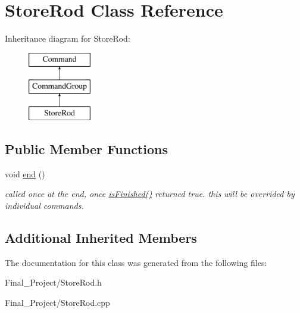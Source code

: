 \hypertarget{classStoreRod}{\section{Store\-Rod Class Reference}
\label{classStoreRod}
}
Inheritance diagram for Store\-Rod\-:\begin{figure}[H]
\begin{center}
\leavevmode
\includegraphics[height=3.000000cm]{classStoreRod}
\end{center}
\end{figure}
\subsection*{Public Member Functions}
\begin{DoxyCompactItemize}
\item 
\hypertarget{classStoreRod_a2fe691b28cb7c6942242caa35e43eecb}{void \hyperlink{classStoreRod_a2fe691b28cb7c6942242caa35e43eecb}{end} ()}\label{classStoreRod_a2fe691b28cb7c6942242caa35e43eecb}

\begin{DoxyCompactList}\small\item\em called once at the end, once \hyperlink{classCommandGroup_a96807a2763adf9e21ebf2cb9e3574e3c}{is\-Finished()} returned true. this will be overrided by individual commands. \end{DoxyCompactList}\end{DoxyCompactItemize}
\subsection*{Additional Inherited Members}


The documentation for this class was generated from the following files\-:\begin{DoxyCompactItemize}
\item 
Final\-\_\-\-Project/Store\-Rod.\-h\item 
Final\-\_\-\-Project/Store\-Rod.\-cpp\end{DoxyCompactItemize}
